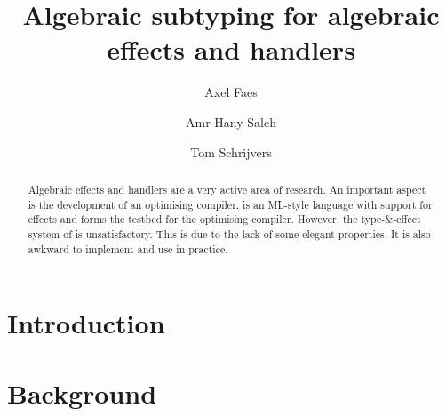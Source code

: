 \documentclass[sigplan,10pt]{acmart}\settopmatter{printfolios=true}
\begin{document}
\title{Algebraic subtyping for algebraic effects and handlers}

\author{Axel Faes}

\author{Amr Hany Saleh}

\author{Tom Schrijvers}


\begin{abstract}
Algebraic effects and handlers are a very active area of research. An important aspect is the development of an optimising compiler. \eff is an ML-style language with support for effects and forms the testbed for the optimising compiler. However, the type-\&-effect system of \eff is unsatisfactory. This is due to the lack of some elegant properties. It is also awkward to implement and use in practice.
\end{abstract}

\maketitle

\tableofcontents

\listoffigures
\listoftables

\section{Introduction}


\section{Background}

\end{document}
